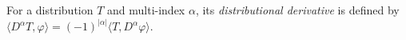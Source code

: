 
For a distribution $T$ and multi-index $\alpha$, its \emph{distributional derivative} is defined by $\langle D^\alpha T,\varphi\rangle=(-1)^{|\alpha|}\langle T,D^\alpha\varphi\rangle$.
